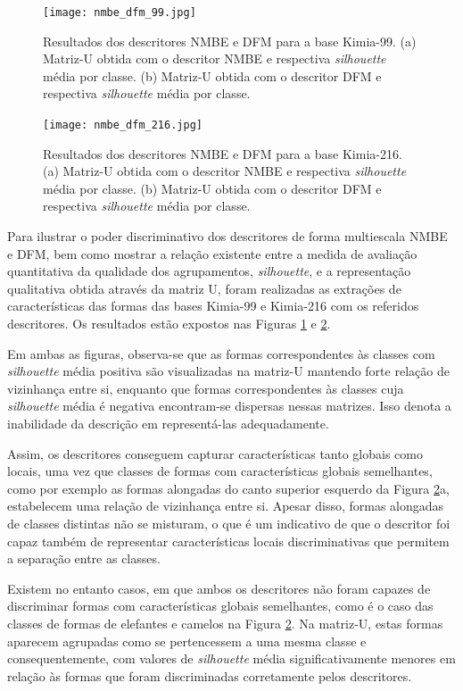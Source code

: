 \begin{figure}[t]
 \caption{\label{fig:nmbe_dfm_99} Resultados dos descritores NMBE e DFM para a base Kimia-99. (a) Matriz-U obtida com o descritor NMBE e respectiva \textit{silhouette} média por classe. (b) Matriz-U obtida com o descritor DFM e respectiva \textit{silhouette} média por classe.}
  \centering
  \texttt{[image: nmbe\_dfm\_99.jpg]}
\end{figure}

\begin{figure}[t]
 \caption{\label{fig:nmbe_dfm_216} Resultados dos descritores NMBE e DFM para a base Kimia-216. (a) Matriz-U obtida com o descritor NMBE e respectiva \textit{silhouette} média por classe. (b) Matriz-U obtida com o descritor DFM e respectiva \textit{silhouette} média por classe.}
  \centering
  \texttt{[image: nmbe\_dfm\_216.jpg]}
\end{figure}

Para ilustrar o poder discriminativo dos descritores de forma multiescala \gls{NMBE} e \gls{DFM}, bem como mostrar a relação existente entre a medida de avaliação quantitativa da qualidade dos agrupamentos, \emph{silhouette}, e a representação qualitativa obtida através da matriz U, foram realizadas as extrações de características das formas das bases Kimia-99 e Kimia-216 com os referidos descritores. Os resultados estão expostos nas Figuras \ref{fig:nmbe_dfm_99} e \ref{fig:nmbe_dfm_216}. 

Em ambas as figuras, observa-se que as formas correspondentes às classes com  \emph{silhouette} média positiva são visualizadas na matriz-U mantendo forte relação de vizinhança entre si, enquanto que formas correspondentes às classes cuja \emph{silhouette} média é negativa encontram-se dispersas nessas matrizes. Isso denota a inabilidade da descrição  em representá-las adequadamente.

Assim, os descritores conseguem capturar características tanto globais como locais, uma vez que classes de formas com características globais semelhantes, como por exemplo as formas alongadas do canto superior esquerdo da Figura \ref{fig:nmbe_dfm_216}a, estabelecem uma relação de vizinhança entre si. Apesar disso, formas alongadas de classes distintas não se misturam, o que é um indicativo de que o descritor foi capaz também de representar características locais discriminativas que permitem a separação entre as classes.

Existem no entanto casos, em que ambos os descritores não foram capazes de discriminar formas com características globais semelhantes, como é o caso das classes de formas de elefantes e camelos na Figura \ref{fig:nmbe_dfm_216}. Na matriz-U, estas formas aparecem agrupadas como se pertencessem a uma mesma classe e consequentemente, com valores de \emph{silhouette} média significativamente menores em relação às formas que foram discriminadas corretamente pelos descritores.

